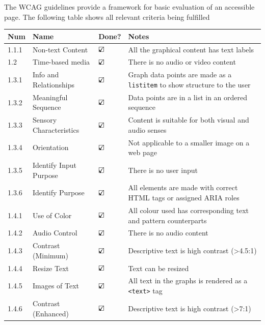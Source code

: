 \documentclass[ %
                    author={Aleena Baig},
                supervisor={Dr Simon Lock},
                    degree={BSc},
                     title={On Making Web Accessible Graphs},
                  subtitle={},
                      year={2019} ]{dissertation}
\begin{document}
The WCAG guidelines provide a framework for basic evaluation of an accessible page. The following table shows all relevant criteria being fulfilled

\begin{center}
\begin{longtable}{|p{2cm}|p{5cm}|p{2cm}|p{5cm}|}
 \hline
 Num & Name & Done? & Notes \\ [0.5ex]
 \hline \hline
 1.1.1 & Non-text Content & $\text{\rlap{$\checkmark$}}\square$ & All the graphical content has text labels\\
 \hline
 1.2 & Time-based media & $\text{\rlap{$\checkmark$}}\square$ & There is no audio or video content\\
 \hline
 1.3.1 & Info and Relationships & $\text{\rlap{$\checkmark$}}\square$ & Graph data points are made as a \texttt{listitem} to show structure to the user\\
 \hline
 1.3.2 & Meaningful Sequence & $\text{\rlap{$\checkmark$}}\square$ & Data points are in a list in an ordered sequence\\
 \hline
 1.3.3 & Sensory Characteristics & $\text{\rlap{$\checkmark$}}\square$ & Content is suitable for both visual and audio senses\\
 \hline
 1.3.4 & Orientation & $\text{\rlap{$\checkmark$}}\square$ & Not applicable to a smaller image on a web page\\
 \hline
 1.3.5 & Identify Input Purpose & $\text{\rlap{$\checkmark$}}\square$ & There is no user input\\
 \hline
 1.3.6 & Identify Purpose & $\text{\rlap{$\checkmark$}}\square$ & All elements are made with correct HTML tags or assigned ARIA roles\\
 \hline
 1.4.1 & Use of Color & $\text{\rlap{$\checkmark$}}\square$ & All colour used has corresponding text and pattern counterparts\\
 \hline
 1.4.2 & Audio Control & $\text{\rlap{$\checkmark$}}\square$ & There is no audio content\\
 \hline
 1.4.3 & Contrast (Minimum) & $\text{\rlap{$\checkmark$}}\square$ & Descriptive text is high contrast (\textgreater 4.5:1)\\
 \hline
 1.4.4 & Resize Text & $\text{\rlap{$\checkmark$}}\square$ & Text can be resized\\
 \hline
 1.4.5 & Images of Text & $\text{\rlap{$\checkmark$}}\square$ & All text in the graphs is rendered as a \texttt{<text>} tag\\
 \hline
 1.4.6 & Contrast (Enhanced) & $\text{\rlap{$\checkmark$}}\square$ & Descriptive text is high contrast (\textgreater 7:1)\\

\end{longtable}
\end{center}
\end{document}
